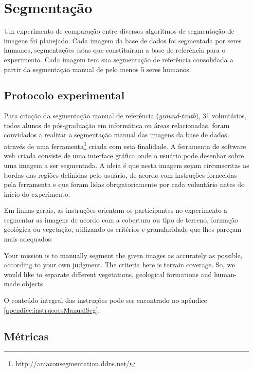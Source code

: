 \section{Segmentação}

Um experimento de comparação entre diversos algoritmos de segmentação de imagens foi planejado. Cada imagem da base de dados foi segmentada por seres humanos, segmentações estas que constituíram a base de referência para o experimento. Cada imagem tem sua segmentação de referência consolidada a partir da segmentação manual de pelo menos 5 seres humanos.

\subsection{Protocolo experimental}

Para criação da segmentação manual de referência (\textit{ground-truth}), 31 voluntários, todos alunos de pós-graduação em informática ou áreas relacionadas, foram convidados a realizar a segmentação manual das imagens da base de dados, através de uma ferramenta\footnote{http://amazonsegmentation.ddns.net/} criada com esta finalidade. A ferramenta de software web criada consiste de uma interface gráfica onde o usuário pode desenhar sobre uma imagem a ser segmentada. A ideia é que nesta imagem sejam circunscritas as bordas das regiões definidas pelo usuário, de acordo com instruções fornecidas pela ferramenta e que foram lidas obrigatoriamente por cada voluntário antes do início do experimento.

Em linhas gerais, as instruções orientam os participantes no experimento a segmentar as imagens de acordo com a cobertura ou tipo de terreno, formação geológica ou vegetação, utilizando os critérios e granularidade que lhes pareçam mais adequados:

\begin{citacao}[english]
Your mission is to manually segment the given images as accurately as possible, according to your own judgment. The criteria here is terrain coverage. So, we would like to separate different vegetations, geological formations and human-made objects \cite{amazonsegmentation}
\end{citacao}

O conteúdo integral das instruções pode ser encontrado no apêndice \ref{apendice:instrucoesManualSeg}.

\subsection{Métricas}

